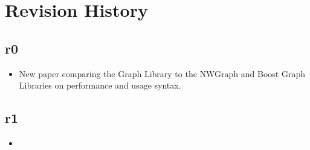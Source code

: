\section{Revision History}

\subsection*{\paperno r0}

\begin{itemize}
    \item New paper comparing the Graph Library to the NWGraph and Boost Graph Libraries 
          on performance and usage syntax.
\end{itemize}

\subsection*{\paperno r1}

\begin{itemize}
    \item <First change>
\end{itemize}
